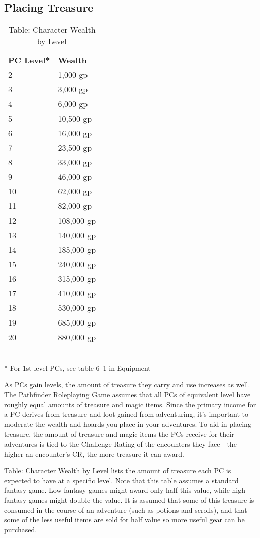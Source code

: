 \subsection{Placing Treasure}

\begin{table}[]
\sffamily
\caption{Table: Character Wealth by Level}
\begin{tabularx}{\linewidth}{lX}
\textbf{PC Level*} & \textbf{Wealth}\\
2 & 1,000 gp \\
 3 & 3,000 gp \\
 4 & 6,000 gp \\
 5 & 10,500 gp \\
 6 & 16,000 gp \\
 7 & 23,500 gp \\
 8 & 33,000 gp \\
 9 & 46,000 gp \\
 10 & 62,000 gp \\
 11 & 82,000 gp \\
 12 & 108,000 gp \\
 13 & 140,000 gp \\
 14 & 185,000 gp \\
 15 & 240,000 gp \\
 16 & 315,000 gp \\
 17 & 410,000 gp \\
 18 & 530,000 gp \\
 19 & 685,000 gp \\
 20 & 880,000 gp\\
\end{tabularx}\\
* For 1st-level PCs, see table 6--1 in Equipment
\end{table}

As PCs gain levels, the amount of treasure they carry and use increases as well. The Pathfinder Roleplaying Game assumes that all PCs of equivalent level have roughly equal amounts of treasure and magic items. Since the primary income for a PC derives from treasure and loot gained from adventuring, it's important to moderate the wealth and hoards you place in your adventures. To aid in placing treasure, the amount of treasure and magic items the PCs receive for their adventures is tied to the Challenge Rating of the encounters they face---the higher an encounter's CR, the more treasure it can award.
				
Table: Character Wealth by Level lists the amount of treasure each PC is expected to have at a specific level. Note that this table assumes a standard fantasy game. Low-fantasy games might award only half this value, while high-fantasy games might double the value. It is assumed that some of this treasure is consumed in the course of an adventure (such as potions and scrolls), and that some of the less useful items are sold for half value so more useful gear can be purchased. 
				

